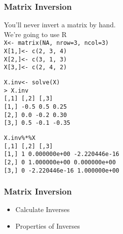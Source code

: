 \documentclass{beamer}
\newtheorem{thm}{Theorem}
\numberwithin{equation}{section}
\begin{document}
\begin{frame}
\frametitle{Matrix Inversion}

\alert{You'll never invert a matrix by hand}. \\
\alert{We're going to use R} \\
{\tt X<- matrix(NA, nrow=3, ncol=3) } \\
{\tt X[1,]<- c(2, 3, 4) } \\
{\tt X[2,]<- c(3, 1, 3) } \\
{\tt X[3,]<- c(2, 4, 2) } 

{\tt X.inv<- solve(X) } \\
{\tt > X.inv  } \\
{\tt      [,1] [,2]  [,3] } \\
{\tt [1,] -0.5  0.5  0.25} \\
{\tt [2,]  0.0 -0.2  0.30 } \\
{\tt [3,]  0.5 -0.1 -0.35 } 

{\tt  X.inv\%*\%X } \\
{\tt      [,1]          [,2]          [,3]} \\
{\tt [1,]    1  0.000000e+00 -2.220446e-16 }\\
{\tt [2,]    0  1.000000e+00  0.000000e+00 }\\
{\tt [3,]    0 -2.220446e-16  1.000000e+00} \\
\end{frame}



\begin{frame}
\frametitle{Matrix Inversion}
\begin{itemize}
\item[1)] Calculate Inverses
\item[2)] \alert{Properties of Inverses} 
\end{itemize}


\pause 

\pause 


\end{frame}
\end{document}
